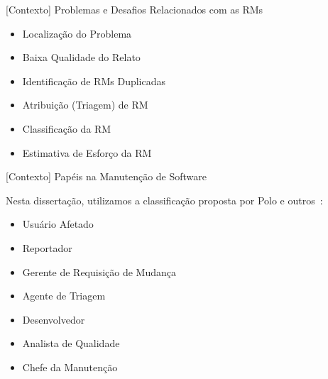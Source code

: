 \documentclass[t,14pt,mathserif]{beamer}
\begin{document}



\begin{frame}{[Contexto] Problemas e Desafios Relacionados com as RMs}
	\begin{itemize}

        \item Localização do Problema
        \item Baixa Qualidade do Relato
        \item Identificação de RMs Duplicadas
        \item Atribuição (Triagem) de RM
        \item Classificação da RM
        \item Estimativa de Esforço da RM

	\end{itemize}
\end{frame}

\begin{frame}{[Contexto] Papéis na Manutenção de Software}

    Nesta dissertação, utilizamos a classificação proposta por Polo e
    outros~\cite{Polo1999}:

	\begin{itemize}
        \item Usuário Afetado
        \item Reportador
        \item Gerente de Requisição de Mudança
        \item Agente de Triagem
        \item Desenvolvedor
        \item Analista de Qualidade
        \item Chefe da Manutenção
    \end{itemize}

\end{frame}
\end{document}
